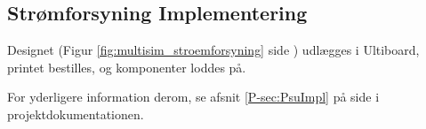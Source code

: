 \subsection{Strømforsyning Implementering}
\label{ch:stroemforsyning_impl}

Designet (Figur \ref{fig:multisim_stroemforsyning} side \pageref{fig:multisim_stroemforsyning}) udlægges i Ultiboard, printet bestilles, og komponenter loddes på. 

For yderligere information derom, se afsnit \ref{P-sec:PsuImpl}  på side \pageref{P-sec:PsuImpl} i projektdokumentationen. 

\clearpage